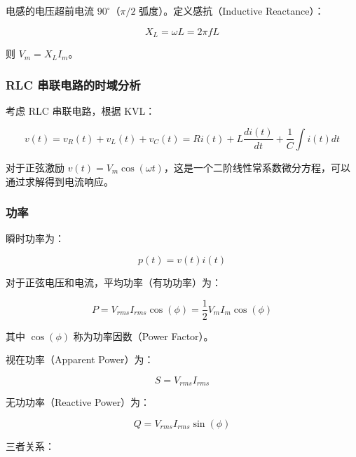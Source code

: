 电感的电压超前电流 $90^\circ$（$\pi/2$ 弧度）。定义感抗（Inductive Reactance）：

\begin{equation}
X_L = \omega L = 2\pi f L \label{eq:inductive-reactance}
\end{equation}

则 $V_m = X_L I_m$。

\subsubsection{RLC 串联电路的时域分析}

考虑 RLC 串联电路，根据 KVL：

\begin{equation}
v(t) = v_R(t) + v_L(t) + v_C(t) = R i(t) + L \frac{di(t)}{dt} + \frac{1}{C} \int i(t) dt \label{eq:rlc-series-ac}
\end{equation}

对于正弦激励 $v(t) = V_m \cos(\omega t)$，这是一个二阶线性常系数微分方程，可以通过求解得到电流响应。

\subsubsection{功率}

瞬时功率为：

\begin{equation}
p(t) = v(t) i(t) \label{eq:instantaneous-power}
\end{equation}

对于正弦电压和电流，平均功率（有功功率）为：

\begin{equation}
P = V_{rms} I_{rms} \cos(\phi) = \frac{1}{2} V_m I_m \cos(\phi) \label{eq:average-power}
\end{equation}

其中 $\cos(\phi)$ 称为功率因数（Power Factor）。

视在功率（Apparent Power）为：

\begin{equation}
S = V_{rms} I_{rms} \label{eq:apparent-power}
\end{equation}

无功功率（Reactive Power）为：

\begin{equation}
Q = V_{rms} I_{rms} \sin(\phi) \label{eq:reactive-power}
\end{equation}

三者关系：

